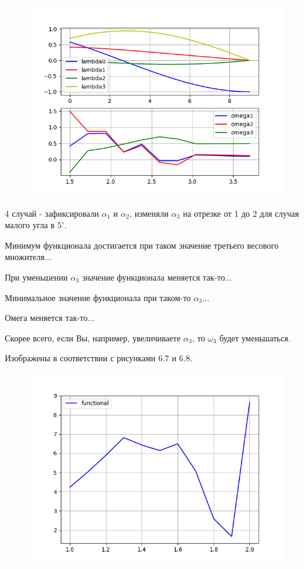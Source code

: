 \documentclass[14pt]{extreport}
\begin{document}
\begin{figure}[H]
\center\includegraphics[scale=0.8]{fig/ivp_and_control_alpha2_1_5-3_7_50.png}
\caption{}
\end{figure}

4 случай - зафиксировали $\alpha_1$ и $\alpha_2$, изменяли $\alpha_3$ на отрезке от 1 до 2 для случая малого угла в $5^{\circ}$.

Минимум функционала достигается при таком значение третьего весового множителя...

При уменьшении $\alpha_3$ значение функционала меняется так-то...

Минимальное значение функционала при таком-то $\alpha_3$...

Омега меняется так-то...

Скорее всего, если Вы, например, увеличиваете $\alpha_3$, то $\omega_3$ будет уменьшаться.

Изображены в соответствии с рисунками 6.7 и 6.8.

\begin{figure}[H]
\center\includegraphics[scale=0.8]{fig/functional_alpha2_1-2_5.png}
\caption{}
\end{figure}
\end{document}
